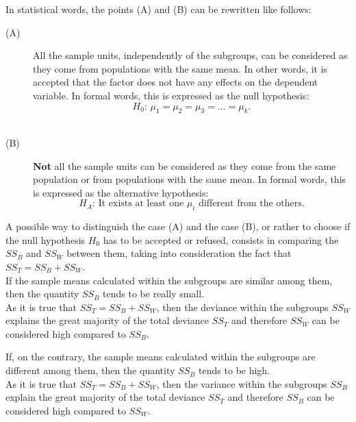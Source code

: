 \begin{frame}
  In statistical words, the points (A) and (B) can be rewritten like follows:
  \begin{description}
    \item[(A)] All the sample units, independently of the subgroups, can be considered as they come from populations with the same mean.
      In other words, it is accepted that the factor does not have any effects on the dependent variable. In formal words, this is expressed as the null hypothesis:
      $$ H_0: \, \mu_1= \mu_2 = \mu_3 = \dots = \mu_k \mbox{.}$$ \\
    \item[(B)] \textbf{Not} all the sample units can be considered as they come from the same population or from populations with the same mean. In formal words, this is expressed as the alternative hypothesis:
      $$ H_A: \, \mbox{It exists at least one } \mu_i \mbox{ different from the others.} $$
  \end{description}
\end{frame}

\begin{frame}
  \vspace*{.25cm}
  A possible way to distinguish the case (A) and the case (B), or rather to choose if the null hypothesis $H_0$ has to be accepted or refused, consists in comparing the {\boldmath $ SS_B $} and {\boldmath $ SS_W $} between them, taking into consideration the fact that $ SS_T = SS_B + SS_W $. \\
  \vspace*{.75cm}
  If the sample means calculated within the subgroups are similar among them, then the quantity {\boldmath $SS_B$} tends to be really small.\\
  \vspace*{.25cm}
  As it is true that $ SS_T = SS_B + SS_W $, then the deviance within the subgroups {\boldmath$SS_W$} explains the great majority of the total deviance {\boldmath$SS_T$} and therefore {\boldmath$SS_W$} can be considered high compared to {\boldmath $SS_B$}.
\end{frame}

\begin{frame}
  \vspace*{.25cm}
  If, on the contrary, the sample means calculated within the subgroups are different among them, then the quantity {\boldmath$SS_B$} tends to be high.\\
  \vspace*{.25cm}
  As it is true that $ SS_T=  SS_B + SS_W $, then the variance within the subgroups {\boldmath$SS_B$} explain the great majority of the total deviance {\boldmath$SS_T$} and therefore {\boldmath$SS_B$} can be considered high compared to {\boldmath$SS_W$}.
\end{frame}

